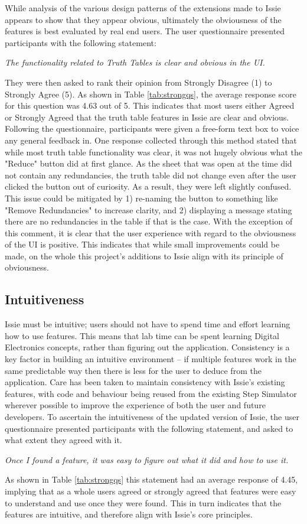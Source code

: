 While analysis of the various design patterns of the extensions made to Issie appears to show that they appear obvious, ultimately the obviousness of the features is best evaluated by real  end users. The user questionnaire presented participants with the following statement:
\begin{center}
    \textit{The functionality related to Truth Tables is clear and obvious in the UI.}
\end{center}
They were then asked to rank their opinion from Strongly Disagree (1) to Strongly Agree (5). As shown in Table \ref{tab:strongqs}, the average response score for this question was 4.63 out of 5. This indicates that most users either Agreed or Strongly Agreed that the truth table features in Issie are clear and obvious. Following the questionnaire, participants were given a free-form text box to voice any general feedback in. One response collected through this method stated that while most truth table functionality was clear, it was not hugely obvious what the "Reduce" button did at first glance. As the sheet that was open at the time did not contain any redundancies, the truth table did not change even after the user clicked the button out of curiosity. As a result, they were left slightly confused. This issue could be mitigated by 1) re-naming the button to something like "Remove Redundancies" to increase clarity, and 2) displaying a message stating there are no redundancies in the table if that is the case. 
With the exception of this comment, it is clear that the user experience with regard to the obviousness of the UI is positive. This indicates that while small improvements could be made, on the whole this project's additions to Issie align with its principle of obviousness.

\subsection{Intuitiveness}
Issie must be intuitive; users should not have to spend time and effort learning how to use features. This means that lab time can be spent learning Digital Electronics concepts, rather than figuring out the application. Consistency is a key factor in building an intuitive environment -- if multiple features work in the same predictable way then there is less for the user to deduce from the application. Care has been taken to maintain consistency with Issie's existing features, with code and behaviour being reused from the existing Step Simulator wherever possible to improve the experience of both the user and future developers. To ascertain the intuitiveness of the updated version of Issie, the user questionnaire presented participants with the following statement, and asked to what extent they agreed with it.
\begin{center}
    \textit{Once I found a feature, it was easy to figure out what it did and how to use it.}
\end{center}
As shown in Table \ref{tab:strongqs} this statement had an average response of 4.45, implying that as a whole users agreed or strongly agreed that features were easy to understand and use once they were found. This in turn indicates that the features are intuitive, and therefore align with Issie's core principles.

